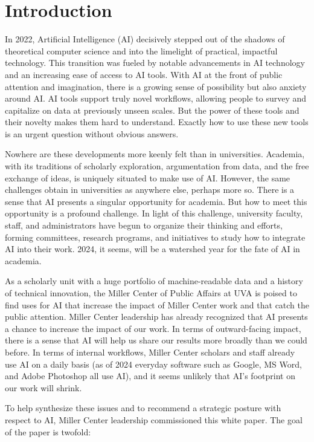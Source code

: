 \documentclass[12pt, oneside]{article}   	%
\begin{document}
\section{Introduction}\label{section.introduction}
In 2022, Artificial Intelligence (AI) decisively stepped out of the shadows of theoretical computer science and into the limelight of practical, impactful technology. This transition was fueled by notable advancements in AI technology and an increasing ease of access to AI tools.  With AI at the front of public attention and imagination, there is a growing sense of possibility but also anxiety around AI.  AI tools support truly novel workflows, allowing people to survey and capitalize on data at previously unseen scales.  But the power of these tools and their novelty makes them hard to understand.  Exactly how to use these new tools is an urgent question without obvious answers.

Nowhere are these developments more keenly felt than in universities.  Academia, with its traditions of scholarly exploration, argumentation from data, and the free exchange of ideas, is uniquely situated to make use of AI.  However, the same challenges obtain in universities as anywhere else, perhaps more so.  There is a sense that AI presents a singular opportunity for academia.  But how to meet this opportunity is a profound challenge.  In light of this challenge, university faculty, staff, and administrators have begun to organize their thinking and efforts, forming committees, research programs, and initiatives to study how to integrate AI into their work.  2024, it seems, will be a watershed year for the fate of AI in academia.

As a scholarly unit with a huge portfolio of machine-readable data and a history of technical innovation, the Miller Center of Public Affairs at UVA is poised to find uses for AI that  increase the impact of Miller Center work and that catch the public attention.   Miller Center leadership  has already recognized that AI presents a chance to increase the impact of our work.  In terms of outward-facing impact, there is a sense that AI will help us share our results more broadly than we could before.  In terms of internal workflows, Miller Center scholars and staff already use AI on a daily basis (as of 2024 everyday software such as Google, MS Word, and Adobe Photoshop all use AI), and it seems unlikely that AI's footprint on our work will shrink.

To help synthesize these issues and to recommend a strategic posture with respect to AI, Miller Center leadership commissioned this white paper.  The goal of the paper is twofold:
\end{document}
